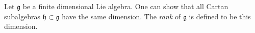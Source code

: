 \documentclass[12pt]{article}
\newcommand{\lh}{\mathfrak{h}}
\newcommand{\lag}{\mathfrak{g}}
\begin{document}
Let $\lag$ be a finite dimensional Lie algebra.
One can show that all Cartan subalgebras $\lh\subset\lag$ have the same
dimension. The \emph{rank} of $\lag$ is defined to be this dimension.
\end{document}
